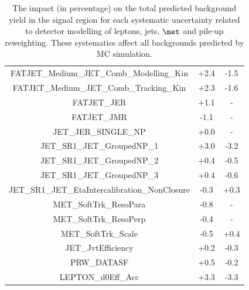 \begin{table}[htbp!]
\begin{center}
\begin{tabular}{c|c|c}
FATJET\_Medium\_JET\_Comb\_Modelling\_Kin                    &     +2.4 &     -1.5  \\
FATJET\_Medium\_JET\_Comb\_Tracking\_Kin                     &     +2.3 &     -1.6  \\
FATJET\_JER                                                  &     +1.1 &        -  \\
FATJET\_JMR                                                  &     -1.1 &        -  \\
JET\_JER\_SINGLE\_NP                                         &     +0.0 &        -  \\
JET\_SR1\_JET\_GroupedNP\_1                                  &     +3.0 &     -3.2  \\
JET\_SR1\_JET\_GroupedNP\_2                                  &     +0.4 &     -0.5  \\
JET\_SR1\_JET\_GroupedNP\_3                                  &     +0.4 &     -0.6  \\
JET\_SR1\_JET\_EtaIntercalibration\_NonClosure               &     -0.3 &     +0.3  \\
MET\_SoftTrk\_ResoPara                                       &     -0.8 &        -  \\
MET\_SoftTrk\_ResoPerp                                       &     -0.4 &        -  \\
MET\_SoftTrk\_Scale                                          &     -0.5 &     +0.4  \\
JET\_JvtEfficiency                                           &     +0.2 &     -0.3  \\
PRW\_DATASF                                                  &     +0.5 &     -0.2  \\
LEPTON\_d0Eff\_Acc                                           &     +3.3 &     -3.3  \\
\end{tabular}
\end{center}
\caption{The impact (in percentage) on the total predicted background yield in the 
signal region for each systematic uncertainty related to detector modelling of leptons, 
jets, $\met$ and pile-up reweighting. These systematics affect all backgrounds predicted by MC simulation.} 
\label{tab:boosted_systematics_det1_sr_background}
\end{table}

